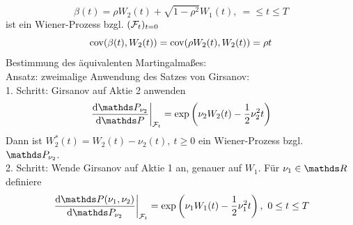 \[
\beta(t)=\rho W_2(t)+\sqrt{1-\rho^2}W_1(t),~=\le t\le T
\]
ist ein Wiener-Prozess bzgl. $(\mathcal{F}_t)_{t=0}$
\[
\operatorname{cov}(\beta(t),W_2(t))=\operatorname{cov}(\rho W_2(t),W_2(t))=\rho t
\]
Bestimmung des äquivalenten Martingalmaßes:\\
Ansatz:
zweimalige Anwendung des Satzes von Girsanov:\\
1. Schritt:
Girsanov auf Aktie 2 anwenden
\[
\left.\difff{\Pw_{\nu_2}}{\Pw}\right|_{\F_t}=\exp\enbrace{\nu_2 W_2(t)-\frac{1}{2}\nu_2^2t}
\]
Dann ist $W_2^*(t)=W_2(t)-\nu_2(t),~t\ge0$ ein Wiener-Prozess bzgl. $\Pw_{\nu_2}$.\\
2. Schritt:
Wende Girsanov auf Aktie 1 an, genauer auf $W_1$.
Für $\nu_1\in \R$ definiere
\[
\left.\difff{\Pw{(\nu_1,\nu_2)}}{\Pw_{\nu_2}}\right|_{\F_t}=\exp\enbrace{\nu_1 W_1(t)-\frac{1}{2}\nu_1^2t},~0\le t\le T
\]






\cleardoubleoddemptypage
{}
\setcounter{page}{1}


\printindex
\listoffigures
